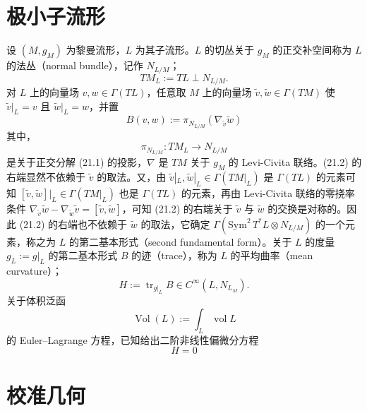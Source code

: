 \section{极小子流形}

设 $(M, g_M)$ 为黎曼流形，$L$ 为其子流形。$L$ 的切丛关于 $g_M$ 的正交补空间称为 $L$ 的法丛（normal bundle），记作 $N_{L/M}$；
\begin{equation}
TM_{L} := TL \perp N_{L/M}. \tag{21.1}
\end{equation}
对 $L$ 上的向量场 $v, w \in \Gamma(TL)$，任意取 $M$ 上的向量场 $\tilde v, \tilde w \in \Gamma(TM)$ 使 $\tilde v|_{L} = v$ 且 $\tilde w|_{L} = w$，并置
\begin{equation}
B(v, w) := \pi_{N_{L/M}}\left(\nabla_{\tilde v}\tilde w\right) \tag{21.2}
\end{equation}
其中，
\begin{equation}
\pi_{N_{L/M}} : TM_{L} \to N_{L/M} \tag{21.3}
\end{equation}
是关于正交分解 (21.1) 的投影，$\nabla$ 是 $TM$ 关于 $g_M$ 的 Levi-Civita 联络。(21.2) 的右端显然不依赖于 $\tilde v$ 的取法。又，由 $\tilde v|_{L}, \tilde w|_{L} \in \Gamma(TM|_{L})$ 是 $\Gamma(TL)$ 的元素可知 $[\tilde v, \tilde w]|_{L} \in \Gamma(TM|_{L})$ 也是 $\Gamma(TL)$ 的元素，再由 Levi-Civita 联络的零挠率条件 $\nabla_{\tilde v}\tilde w - \nabla_{\tilde w}\tilde v = [\tilde v, \tilde w]$，可知 (21.2) 的右端关于 $\tilde v$ 与 $\tilde w$ 的交换是对称的。因此 (21.2) 的右端也不依赖于 $\tilde w$ 的取法，它确定 $\Gamma(\mathrm{Sym}^{2}\,T^{*}L \otimes N_{L/M})$ 的一个元素，称之为 $L$ 的第二基本形式（second fundamental form）。关于 $L$ 的度量 $g_L := g|_{L}$ 的第二基本形式 $B$ 的迹（trace），称为 $L$ 的平均曲率（mean curvature）；
\begin{equation}
H := \operatorname{tr}_{g|_{L}} B \in C^{\infty}(L, N_{L_M}). \tag{21.4}
\end{equation}
关于体积泛函
\begin{equation}
\operatorname{Vol}(L) := \int_{L}\operatorname{vol}L \tag{21.5}
\end{equation}
的 Euler--Lagrange 方程，已知给出二阶非线性偏微分方程
\begin{equation}
H = 0 \tag{21.6}
\end{equation}


\section{校准几何}

